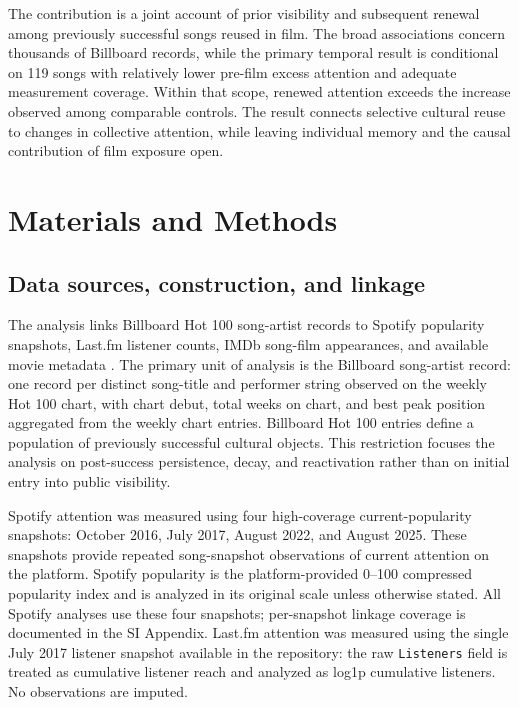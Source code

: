 \documentclass[10pt]{article}
\begin{document}
The contribution is a joint account of prior visibility and subsequent renewal among previously successful songs reused in film. The broad associations concern thousands of Billboard records, while the primary temporal result is conditional on 119 songs with relatively lower pre-film excess attention and adequate measurement coverage. Within that scope, renewed attention exceeds the increase observed among comparable controls. The result connects selective cultural reuse to changes in collective attention, while leaving individual memory and the causal contribution of film exposure open.

\section*{Materials and Methods}

\subsection*{Data sources, construction, and linkage}

The analysis links Billboard Hot 100 song-artist records to Spotify popularity snapshots, Last.fm listener counts, IMDb song-film appearances, and available movie metadata \citep{Billboard,Spotify,Lastfm,IMDB}. The primary unit of analysis is the Billboard song-artist record: one record per distinct song-title and performer string observed on the weekly Hot 100 chart, with chart debut, total weeks on chart, and best peak position aggregated from the weekly chart entries. Billboard Hot 100 entries define a population of previously successful cultural objects. This restriction focuses the analysis on post-success persistence, decay, and reactivation rather than on initial entry into public visibility.

Spotify attention was measured using four high-coverage current-popularity snapshots: October 2016, July 2017, August 2022, and August 2025. These snapshots provide repeated song-snapshot observations of current attention on the platform. Spotify popularity is the platform-provided 0--100 compressed popularity index and is analyzed in its original scale unless otherwise stated. All Spotify analyses use these four snapshots; per-snapshot linkage coverage is documented in the SI Appendix. Last.fm attention was measured using the single July 2017 listener snapshot available in the repository: the raw \texttt{Listeners} field is treated as cumulative listener reach and analyzed as log1p cumulative listeners. No observations are imputed.
\end{document}
